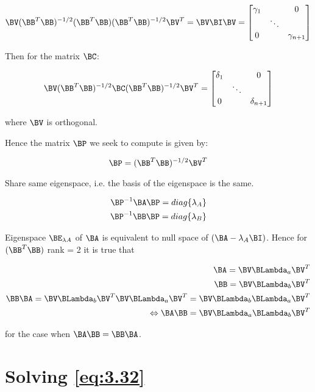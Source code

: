 \begin{equation} \label{eq:A.10}
\BV(\BB^{T}\BB)^{-1/2}(\BB^{T}\BB)(\BB^{T}\BB)^{-1/2}\BV^{T} = \BV\BI\BV = \begin{bmatrix}
\gamma_1 & & 0 \\
 & \ddots & \\
0 & & \gamma_{n+1}
\end{bmatrix}
\end{equation}

Then for the matrix $\BC$:

\begin{equation} \label{eq:A.11}
\BV(\BB^{T}\BB)^{-1/2}\BC(\BB^{T}\BB)^{-1/2}\BV^{T} = \begin{bmatrix}
\delta_1 & & 0 \\
 & \ddots & \\
0 & & \delta_{n+1}
\end{bmatrix}
\end{equation}

where $\BV$ is orthogonal.

Hence the matrix $\BP$ we seek to compute is given by:

\begin{equation} \label{eq:A.12}
\BP = (\BB^T\BB)^{-1/2}\BV^T
\end{equation}

Share same eigenspace, i.e. the basis of the eigenspace is the same.

\begin{eqnarray}
\BP^{-1}\BA\BP = diag\{\lambda_A\} \\
\nonumber
\BP^{-1}\BB\BP = diag\{\lambda_B\}
\end{eqnarray}

Eigenspace $\BE_{\lambda A}$ of $\BA$ is equivalent to null 
space of $(\BA - \lambda_A\BI)$. 
Hence for $(\BB^T\BB)$ rank = 2 it is true
that

\begin{eqnarray}
\BA = \BV\BLambda_a\BV^T \\
\BB = \BV\BLambda_b\BV^T \\
\BB\BA = \BV\BLambda_b\BV^T\BV\BLambda_a\BV^T = \BV\BLambda_b\BLambda_a\BV^T \\
\Leftrightarrow \BA\BB = \BV\BLambda_a\BLambda_b\BV^T
\end{eqnarray}

for the case when $\BA\BB = \BB\BA$.

\section{Solving \ref{eq:3.32}}

